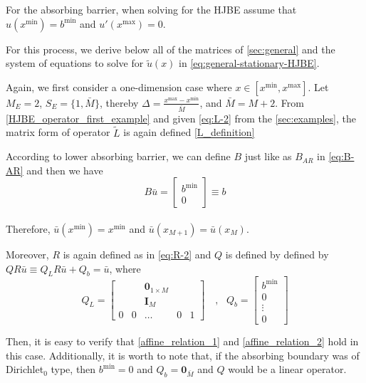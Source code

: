 \documentclass[11pt]{article}
\begin{document}
For the absorbing barrier, when solving for the HJBE assume that $u(x^{\min}) = b^{\min}$ and $u'(x^{\max}) = 0$.

For this process, we derive below all of the matrices of \cref{sec:general} and the system of equations to solve for $\tilde{u}(x)$ in \cref{eq:general-stationary-HJBE}.

Again, we first consider a one-dimension case where $x\in [x^{\min},x^{\max}]$. Let $M_E = 2$, $S_E = \{1,\bar{M}\}$, thereby $\Delta  = \frac{x^{\max}-x^{\min}}{\bar{M}}$, and $\bar{M} = M+2$. From \cref{HJBE_operator_first_example} and given \cref{eq:L-2} from the \cref{sec:examples}, the matrix form of operator $\tilde{L}$ is again defined \cref{L_definition}

According to lower absorbing barrier, we can define $B$ just like as $B_{AR}$ in \cref{eq:B-AR} and then we have
\begin{equation}
B\bar{u} = \begin{bmatrix}
b^{\min}\\
0
\end{bmatrix} \equiv b
\end{equation}\\
Therefore, $\bar{u}(x^{\min}) = x^{\min}$ and $\bar{u}(x_{M+1}) = \bar{u}(x_M)$.

Moreover, $R$ is again defined as in \cref{eq:R-2} and $Q$ is defined by defined by $Q R\bar{u}\equiv Q_L R\bar{u}+Q_b = \bar{u}$, where
\begin{equation}
Q_L = \begin{bmatrix}
& & \mathbf{0}_{1\times M} & & \\
& & \mathbf{I}_M & & \\
0&0&\dots&0&1
\end{bmatrix}%
\quad, \text{ } Q_b = \begin{bmatrix}
b^{\min}\\
0\\
\vdots\\
0
\end{bmatrix}%
\end{equation}

Then, it is easy to verify that \cref{affine_relation_1} and \cref{affine_relation_2} hold in this case. Additionally, it is worth to note that, if the absorbing boundary was of Dirichlet$_0$ type, then $b^{\min} = 0$ and $Q_b = \mathbf{0}_{\bar{M}}$ and $Q$ would be a linear operator.
\end{document}
